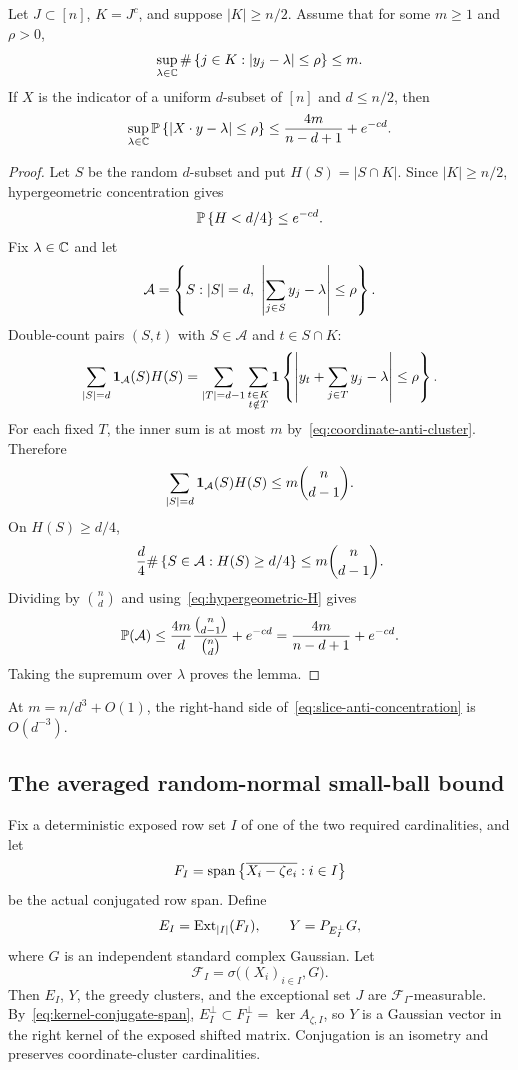\begin{lemma}\label{lem:slice-double-count}
Let $J\subset[n]$, $K=J^c$, and suppose $|K|\ge n/2$. Assume that for some $m\ge1$ and $\rho>0$,
\begin{equation}\label{eq:coordinate-anti-cluster}
  \sup_{\lambda\in\mathbb C}\#\left\{j\in K:|y_j-\lambda|\le\rho\right\}\le m.
\end{equation}
If $X$ is the indicator of a uniform $d$-subset of $[n]$ and $d\le n/2$, then
\begin{equation}\label{eq:slice-anti-concentration}
  \sup_{\lambda\in\mathbb C}\mathbb P\left\{|X\cdot y-\lambda|\le\rho\right\}
  \le\frac{4m}{n-d+1}+e^{-cd}.
\end{equation}
\end{lemma}

\begin{proof}
Let $S$ be the random $d$-subset and put $H(S)=|S\cap K|$. Since $|K|\ge n/2$, hypergeometric concentration gives
\begin{equation}\label{eq:hypergeometric-H}
  \mathbb P\left\{H<d/4\right\}\le e^{-cd}.
\end{equation}
Fix $\lambda\in\mathbb C$ and let
\[
  \mathcal A=\left\{S:|S|=d,\ \left|\sum_{j\in S}y_j-\lambda\right|\le\rho\right\}.
\]
Double-count pairs $(S,t)$ with $S\in\mathcal A$ and $t\in S\cap K$:
\[
  \sum_{|S|=d}\mathbf 1_{\mathcal A}(S)H(S)
  =\sum_{|T|=d-1}\sum_{\substack{t\in K\\t\notin T}}
  \mathbf 1\left\{\left|y_t+\sum_{j\in T}y_j-\lambda\right|\le\rho\right\}.
\]
For each fixed $T$, the inner sum is at most $m$ by~\eqref{eq:coordinate-anti-cluster}. Therefore
\[
  \sum_{|S|=d}\mathbf 1_{\mathcal A}(S)H(S)
  \le m\binom n{d-1}.
\]
On $H(S)\ge d/4$,
\[
  \frac d4\#\left\{S\in\mathcal A:H(S)\ge d/4\right\}
  \le m\binom n{d-1}.
\]
Dividing by $\binom nd$ and using~\eqref{eq:hypergeometric-H} gives
\[
  \mathbb P(\mathcal A)
  \le\frac{4m}{d}\frac{\binom n{d-1}}{\binom nd}+e^{-cd}
  =\frac{4m}{n-d+1}+e^{-cd}.
\]
Taking the supremum over $\lambda$ proves the lemma.
\end{proof}

At $m=n/d^3+O(1)$, the right-hand side of~\eqref{eq:slice-anti-concentration} is $O(d^{-3})$.

\subsection{The averaged random-normal small-ball bound}

Fix a deterministic exposed row set $I$ of one of the two required cardinalities, and let
\[
  F_I=\operatorname{span}\left\{\overline{X_i-\zeta e_i}:i\in I\right\}
\]
be the actual conjugated row span. Define
\[
  E_I=\operatorname{Ext}_{|I|}(F_I),
  \qquad
  Y=P_{E_I^\perp}G,
\]
where $G$ is an independent standard complex Gaussian. Let
\[
  \mathcal F_I=\sigma\bigl((X_i)_{i\in I},G\bigr).
\]
Then $E_I$, $Y$, the greedy clusters, and the exceptional set $J$ are $\mathcal F_I$-measurable. By~\eqref{eq:kernel-conjugate-span}, $E_I^\perp\subset F_I^\perp=\ker A_{\zeta,I}$, so $Y$ is a Gaussian vector in the right kernel of the exposed shifted matrix. Conjugation is an isometry and preserves coordinate-cluster cardinalities.

